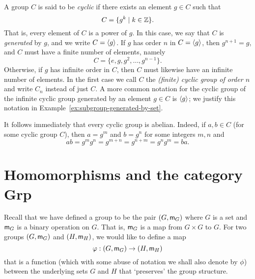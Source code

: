 \begin{example}
    \label{ex:cyclic-group}
    A group \(C\) is said to be \emph{cyclic} if there exists an element \(g \in
    C\) such that
    \[
        C = \{g^k \mid k \in \mathbb{Z}\}.
    \]
    That is, every element of \(C\) is a power of \(g\). In this case, we say
    that \(C\) is \emph{generated} by \(g\), and we write \(C = \langle g \rangle\). If
    \(g\) has order \(n\) in \(C = \langle g \rangle\), then \(g^{n+1} = g\), and \(C\)
    must have a finite number of elements, namely
    \[
        C = \{e, g, g^2, \ldots, g^{n - 1}\}.
    \]
    Otherwise, if \(g\) has infinite order in \(C\), then \(C\) must likewise
    have an infinite number of elements. In the first case we call \(C\) the
    \emph{(finite) cyclic group of order \(n\)} and write \(C_n\) instead of
    just \(C\). A more common notation for the cyclic group of the infinite
    cyclic group generated by an element \(g \in C\) is \(\langle g \rangle\); we justify
    this notation in Example~\ref{ex:subgroup-generated-by-set}.

    It follows immediately that every cyclic group is abelian. Indeed, if \(a, b
    \in C\) (for some cyclic group \(C\)), then \(a = g^m\) and \(b = g^n\) for
    some integers \(m, n\) and
    \[
        ab = g^m g^n = g^{m + n} = g^{n + m} = g^n g^m = ba.
    \]
\end{example}

\section{Homomorphisms and the category {\normalfont\bfseries Grp}}
\label{sec:homomorphisms-grp}

Recall that we have defined a group to be the pair \((G, {\mathsf{m}}_G)\) where \(G\)
is a set and \({\mathsf{m}}_G\) is a binary operation on \(G\). That is, \({\mathsf{m}}_G\) is
a map from \(G \times G\) to \(G\). For two groups \((G, {\mathsf{m}}_G)\) and \((H,
{\mathsf{m}}_H)\), we would like to define a map
\[
    \varphi: (G, {\mathsf{m}}_G) \to (H, {\mathsf{m}}_H)
\]
that is a function (which with some abuse of notation we shall also denote by
\(\phi\)) between the underlying sets \(G\) and \(H\) that `preserves' the group
structure.


